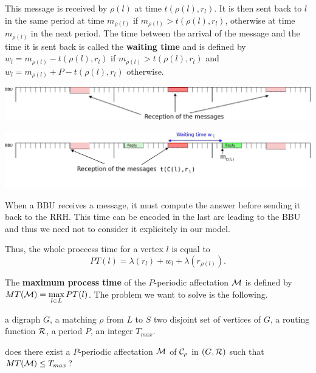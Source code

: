 \documentclass[a4paper,10pt]{article}
\begin{document}
      This message is received by $\rho(l)$ at time $t(\rho(l),r_l)$. It is then sent back to $l$ in the same period at time $m_{\rho(l)}$ if $m_{\rho(l)} > t(\rho(l),r_l)$, otherwise at time $m_{\rho(l)}$ in the next period. The time between the arrival of the message and the time it is sent back is called the \textbf{waiting time} and is defined by $w_l = m_{\rho(l)} - t(\rho(l),r_l)$ if $m_{\rho(l)} > t(\rho(l),r_l)$ and $w_l = m_{\rho(l)} + P - t(\rho(l),r_l)$ otherwise.
      
       \begin{center}
      \includegraphics[scale=0.2]{BBU1.jpeg}
      
      \includegraphics[scale=0.2]{BBU2.jpeg}
      \end{center}
     
      
      When a BBU receives a message, it must compute the answer before sending it back to the RRH. This time can be encoded
      in the last arc leading to the BBU and thus we need not to consider it explicitely in our model.
    
      Thus, the whole proccess time for a vertex $l$ is equal to
      $$
      PT(l)=\lambda(r_l)+ w_l+\lambda(r_{\rho(l)}).
      $$
      
    The {\bf maximum process time} of the $P$-periodic affectation ${\cal M} $ is defined by $MT({\cal M})=\max\limits_{l \in L} PT(l)$. The problem we want to solve is the following. 


        a digraph $G$, a matching $\rho$ from $L$ to $S$ two disjoint set of vertices of $G$, a routing function $\cal R$, a period $P$, an integer $T_{max}$.

       does there exist a $P$-periodic affectation ${\cal M}$ of ${\cal C}_{\rho}$ in $(G,{\cal R})$ such that $MT({\cal M}) \leq T_{max}$?

\end{document}
